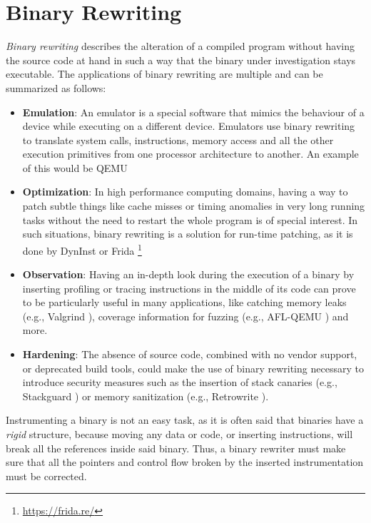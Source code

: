 \documentclass[a4paper,11pt,oneside]{report}
\begin{document}
\section{Binary Rewriting}
\emph{Binary rewriting} describes the alteration of a compiled program without 
having the source code at hand in such a way that the binary under 
investigation stays executable. The applications of binary rewriting are 
multiple and can be summarized as follows:
\begin{itemize}
	\item \textbf{Emulation}: An emulator is a special software that mimics the 
		behaviour of a device while executing on a different device. Emulators 
		use binary rewriting to translate system calls, instructions, memory 
		access and all the other execution primitives from one processor 
		architecture to another.  An example of this would be QEMU \cite{qemu}

	\item \textbf{Optimization}: In high performance computing domains, having 
		a way to patch subtle things like cache misses or timing anomalies in 
		very long running tasks without the need to restart the whole program 
		is of special interest. In such situations, binary rewriting is a 
		solution for run-time patching, as it is done by DynInst \cite{dyninst} 
		or Frida \footnote{\url{https://frida.re/}}

	\item \textbf{Observation}: Having an in-depth look during the execution of 
		a binary by inserting profiling or tracing instructions in the middle 
		of its code can prove to be particularly useful in many applications, 
		like catching memory leaks (e.g., Valgrind \cite{valgrind}), coverage 
		information for fuzzing (e.g., AFL-QEMU \cite{afl}) and more.

	\item \textbf{Hardening}: The absence of source code, combined with no 
		vendor support, or deprecated build tools, could make the use of binary 
		rewriting necessary to introduce security measures such as the 
		insertion of stack canaries (e.g., Stackguard \cite{stackguard}) or 
		memory sanitization (e.g., Retrowrite \cite{dinesh20oakland}).
	
\end{itemize}

Instrumenting a binary is not an easy task, as it is often said that binaries 
have a \emph{rigid} structure, because moving any data or code, or inserting 
instructions, will break all the references inside said binary. Thus, a binary 
rewriter must make sure that all the pointers and control flow broken by the 
inserted instrumentation must be corrected.
\end{document}
